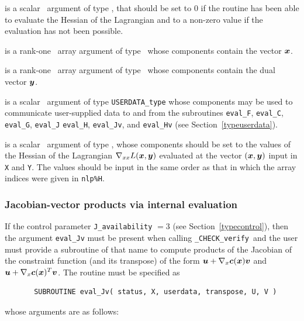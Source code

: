 \documentclass{galahad}
\newcommand{\packagename}{CHECK}
\newcommand{\fullpackagename}{\libraryname\_\packagename}
\newcommand{\solver}{{\tt \fullpackagename\_verify}}
\begin{document}
\begin{description}

 is a scalar \intentout\ argument of type \integer,
that should be set to 0 if the routine has been able to evaluate
the Hessian of the Lagrangian 
and to a non-zero value if the evaluation has not been possible.

 is a rank-one \intentin\ array argument of type \realdp\
whose components contain the vector ${\bm{x}}$.

 is a rank-one \intentin\ array argument of type \realdp\
whose components contain the dual vector ${\bm{y}}$.

 is a scalar \intentinout\ argument of type 
{\tt USERDATA\_type} whose components may be used
to communicate user-supplied data to and from the
subroutines {\tt eval\_F}, {\tt eval\_C}, {\tt eval\_G}, {\tt eval\_J}
{\tt eval\_H}, {\tt eval\_Jv}, and {\tt eval\_Hv} 
(see Section~\ref{typeuserdata}). 

 is a scalar \intentout\ argument of type \realdp,
whose components should be set to the values of the Hessian
of the Lagrangian $\nabla_{xx} L({\bm{x}},{\bm{y}})$
evaluated at the vector $({\bm{x}},{\bm{y}})$ input in {\tt X} and {\tt Y}. The values should
be input in the same order as that in which the array indices were
given in {\tt nlp\%H}.

\end{description}


\subsubsection{Jacobian-vector products via internal evaluation\label{jvfv}}

If the control parameter {\tt J\_availability} $=3$ (see
Section~\ref{typecontrol}), then the argument {\tt eval\_Jv} must be
present when calling \solver\ and the
user must provide a subroutine of that name to compute
products of the Jacobian of the constraint function (and its transpose)
of the form ${\bm{u}} + \nabla_{x} {\bm{c}}({\bm{x}}){\bm{v}}$ and
${\bm{u}} + \nabla_{x} {\bm{c}}({\bm{x}})^T{\bm{v}}$.
The routine must be specified as

\def\baselinestretch{0.8}
{\tt \begin{verbatim}
       SUBROUTINE eval_Jv( status, X, userdata, transpose, U, V ) \end{verbatim} }
\def\baselinestretch{1.0}
\noindent whose arguments are as follows:
\end{document}
